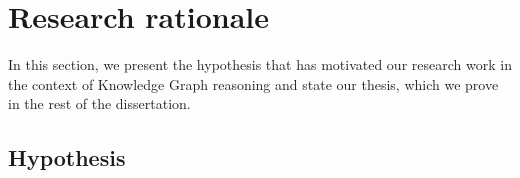 

\section{Research rationale}\label{sec:intro-rationale}
In this section, we present the hypothesis that has motivated our research work in the context of Knowledge Graph reasoning and state our thesis, which we prove in the rest of the dissertation.

\subsection{Hypothesis}









